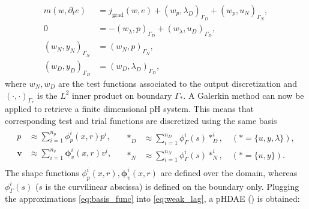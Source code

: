 \documentclass{ifacconf}
\begin{document}
\begin{equation}\label{eq:weak_lag}
\begin{aligned}
m(w, \partial_t{e}) &= j_{\text{grad}}(w, e) + \left(w_p, \lambda_D \right)_{\Gamma_D} + \left(w_p, u_N \right)_{\Gamma_N}, \\
0 &= - \left(w_\lambda, p \right)_{\Gamma_D} + \left(w_\lambda, u_D \right)_{\Gamma_D}, \\
\left(w_N, y_N \right)_{\Gamma_N} &= \left(w_N, p \right)_{\Gamma_N}, \\
\left(w_D, y_D \right)_{\Gamma_D} &= \left(w_D, \lambda_D \right)_{\Gamma_D}, 
\end{aligned}
\end{equation}
where $w_N, w_D$ are the test functions associated to the output discretization and $\left( \cdot, \cdot \right)_{\Gamma_{*}}$ is the $L^2$ inner product on boundary $\Gamma_*$. A Galerkin method can now be applied to retrieve a finite dimensional pH system. This means that corresponding test and trial functions are discretized using the same basis
\begin{equation}
\label{eq:basis_func}
\begin{aligned}
\begin{aligned}
p &\approx \sum_{i=1}^{n_p} \phi_p^i(x, r) p^i, \\
\bm{v} &\approx \sum_{i=1}^{n_v} \bm\phi_v^i(x, r) v^i, \\
\end{aligned} \quad
\begin{aligned}
*_D &\approx \sum_{i=1}^{n_D} \phi^i_\Gamma(s) *^i_D, \quad (* = \{u, y, \lambda\}), \\
*_N &\approx \sum_{i=1}^{n_N} \phi_\Gamma^i(s) *^i_N, \quad (* = \{u,  y\}).
\end{aligned} 
\end{aligned}
\end{equation}
The shape functions $\phi_p^i(x, r), \bm\phi_v^i(x, r)$ are defined over the domain, whereas $\phi_\Gamma^i(s)$ ($s$ is the curvilinear abscissa) is defined on the boundary only. Plugging the approximations \eqref{eq:basis_func} into \eqref{eq:weak_lag}, a pHDAE (\cite{beattie2018linear}) is obtained:
\end{document}
